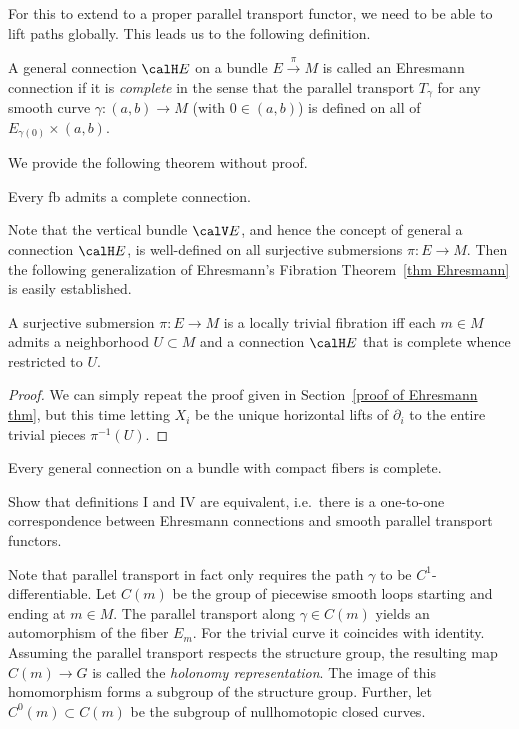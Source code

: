 For this to extend to a proper parallel transport functor, we need to be able to lift paths globally. This leads us to the following definition.

\begin{defn}
    A general connection $\calH E$ on a bundle $E\overset{\pi}{\to}M$ is called an Ehresmann connection if it is \emph{complete} in the sense that the parallel transport $T_\gamma$ for any smooth curve $\gamma:(a,b)\to M$ (with $0\in (a,b)$) is defined on all of $E_{\gamma(0)}\times (a,b)$. 
\end{defn}
We provide the following theorem without proof.
\begin{thm}
    Every \gls{fb} admits a complete connection.
\end{thm}

Note that the vertical bundle $\calV E$, and hence the concept of general a connection $\calH E$, is well-defined on all surjective submersions $\pi:E\to M$. Then the following generalization of Ehresmann's Fibration Theorem~\ref{thm Ehresmann} is easily established.
\begin{thm}[Ehresmann]
    A surjective submersion $\pi:E\to M$ is a locally trivial fibration iff  each $m\in M$ admits a neighborhood $U\subset M$ and a connection $\calH E$ that is complete whence restricted to $U$.
\end{thm}
\begin{proof}
    We can simply repeat the proof given in Section~\ref{proof of Ehresmann thm}, but this time letting $X_i$ be the unique horizontal lifts of $\partial_i$ to the entire trivial pieces $\pi^{-1}(U)$.
\end{proof}

\begin{example}
    Every general connection on a bundle with compact fibers is complete. 
\end{example}


\begin{xca}
    Show that definitions I and IV are equivalent, i.e.\ there is a one-to-one correspondence between Ehresmann connections and smooth parallel transport functors.
\end{xca}


Note that parallel transport in fact only requires the path $\gamma$ to be $C^1$-differentiable. Let $C(m)$ be the group of piecewise smooth loops starting and ending at $m\in M$. The parallel transport along $\gamma\in C(m)$ yields an automorphism of the fiber $E_m$. For the trivial curve it coincides with identity. Assuming the parallel transport respects the structure group, the resulting map $C(m)\to G$ is called the \emph{holonomy representation}. The image of this homomorphism forms a subgroup of the structure group. Further, let $C^0(m)\subset C(m)$ be the subgroup of nullhomotopic closed curves.

